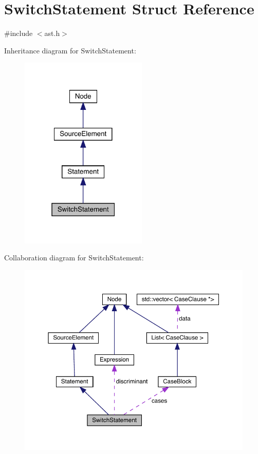 \hypertarget{struct_switch_statement}{}\section{Switch\+Statement Struct Reference}
\label{struct_switch_statement}


{\ttfamily \#include $<$ast.\+h$>$}



Inheritance diagram for Switch\+Statement\+:\nopagebreak
\begin{figure}[H]
\begin{center}
\leavevmode
\includegraphics[width=171pt]{struct_switch_statement__inherit__graph}
\end{center}
\end{figure}


Collaboration diagram for Switch\+Statement\+:\nopagebreak
\begin{figure}[H]
\begin{center}
\leavevmode
\includegraphics[width=350pt]{struct_switch_statement__coll__graph}
\end{center}
\end{figure}
